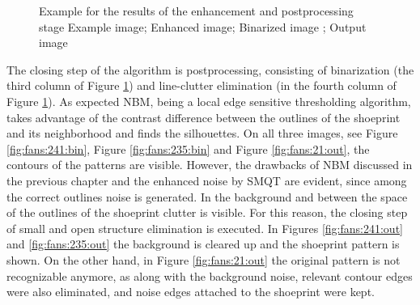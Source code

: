 \documentclass[draft,final]{vutinfth} %
\begin{document}
{\begin{figure}[H]

\caption{Example for the results of the enhancement and postprocessing stage
				 Example image;  Enhanced image;  Binarized image ;  Output image}
\label{fig:fans:enhance}

\end{figure}
}
\par
The closing step of the algorithm is postprocessing, consisting of binarization (the third column of Figure \ref{fig:fans:enhance}) and line-clutter elimination (in the fourth column of Figure \ref{fig:fans:enhance}).
As expected NBM, being a local edge sensitive thresholding algorithm, takes advantage of the contrast difference between the outlines of the shoeprint  and its neighborhood and finds the silhouettes. 
On all three images, see Figure \ref{fig:fans:241:bin}, Figure \ref{fig:fans:235:bin} and Figure \ref{fig:fans:21:out}, the contours of the patterns are visible.
However, the drawbacks of NBM discussed in the previous chapter and the enhanced noise by SMQT are evident, since among the correct outlines noise is generated.
In the background and between the space of the outlines of the shoeprint clutter is visible.
For this reason, the closing step of small and open structure elimination is executed.
In Figures \ref{fig:fans:241:out} and \ref{fig:fans:235:out} the background is cleared up and the shoeprint pattern is shown.
On the other hand, in Figure \ref{fig:fans:21:out} the original pattern is not recognizable anymore, as along with the background noise, relevant contour edges were also eliminated, and noise edges attached to the shoeprint were kept.
\end{document}
